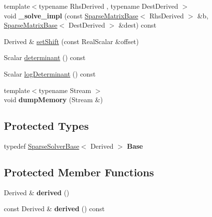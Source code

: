 \begin{DoxyCompactItemize}
\item 
\mbox{\label{class_eigen_1_1_cholmod_base_ad83e9fa24e94410bceadf0eb69793622}} 
{\footnotesize template$<$typename Rhs\+Derived , typename Dest\+Derived $>$ }\\void {\bfseries \+\_\+solve\+\_\+impl} (const \mbox{\hyperlink{class_eigen_1_1_sparse_matrix_base}{Sparse\+Matrix\+Base}}$<$ Rhs\+Derived $>$ \&b, \mbox{\hyperlink{class_eigen_1_1_sparse_matrix_base}{Sparse\+Matrix\+Base}}$<$ Dest\+Derived $>$ \&dest) const
\item 
Derived \& \mbox{\hyperlink{class_eigen_1_1_cholmod_base_a886fc102723ca7bde4ac7162dfd72f5d}{set\+Shift}} (const Real\+Scalar \&offset)
\item 
Scalar \mbox{\hyperlink{class_eigen_1_1_cholmod_base_ab4ffb4a9735ad7e81a01d5789ce96547}{determinant}} () const
\item 
Scalar \mbox{\hyperlink{class_eigen_1_1_cholmod_base_a597f7839a39604af18a8741a0d8c46bf}{log\+Determinant}} () const
\item 
\mbox{\label{class_eigen_1_1_cholmod_base_a1edeab014fff595aef0d8085f459253b}} 
{\footnotesize template$<$typename Stream $>$ }\\void {\bfseries dump\+Memory} (Stream \&)
\end{DoxyCompactItemize}
\subsection*{Protected Types}
\begin{DoxyCompactItemize}
\item 
\mbox{\label{class_eigen_1_1_cholmod_base_adc81958ef5452be2c4acb39a46fa057c}} 
typedef \mbox{\hyperlink{class_eigen_1_1_sparse_solver_base}{Sparse\+Solver\+Base}}$<$ Derived $>$ {\bfseries Base}
\end{DoxyCompactItemize}
\subsection*{Protected Member Functions}
\begin{DoxyCompactItemize}
\item 
\mbox{\label{class_eigen_1_1_cholmod_base_ad213fb2c2199ca597b96f1f79653637f}} 
Derived \& {\bfseries derived} ()
\item 
\mbox{\label{class_eigen_1_1_cholmod_base_af5f23a7e048060c3082c5a1ddfa91932}} 
const Derived \& {\bfseries derived} () const
\end{DoxyCompactItemize}
